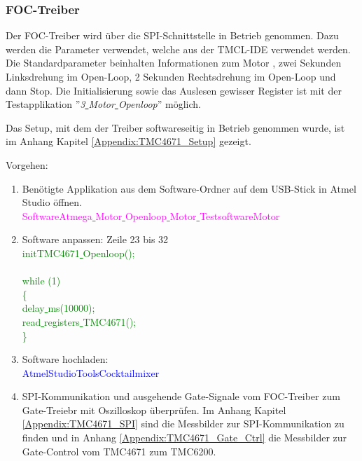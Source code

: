 \subsubsection{FOC-Treiber}
\label{subsubsec:Inbetriebnahme_FOC_Treiber}

Der FOC-Treiber wird über die SPI-Schnittstelle in Betrieb genommen. Dazu werden die Parameter verwendet, welche aus der TMCL-IDE verwendet werden. Die Standardparameter beinhalten Informationen zum Motor , zwei Sekunden Linksdrehung im Open-Loop, 2 Sekunden Rechtsdrehung im Open-Loop und dann Stop. Die Initialisierung sowie das Auslesen gewisser Register ist mit der Testapplikation ''\textit{3\underline{ }Motor\underline{ }Openloop}'' möglich.

Das Setup, mit dem der Treiber softwareseitig in Betrieb genommen wurde, ist im Anhang Kapitel \ref{Appendix:TMC4671_Setup} gezeigt.

Vorgehen:
\begin{enumerate}
\item Benötigte Applikation aus dem Software-Ordner auf dem USB-Stick in Atmel Studio öffnen.\\
\textcolor{magenta}{Software\textrightarrow Atmega\underline{ }Motor\underline{ }Openloop\underline{ }Motor\underline{ }Testsoftware\textrightarrow Motor}\\

\item Software anpassen: Zeile 23 bis 32\\
\textcolor{green}{
	initTMC4671\underline{ }Openloop();\\
\\
    while (1) \\
    \{\\
		\underline{ }delay\underline{ }ms(10000);\\
		read\underline{ }registers\underline{ }TMC4671();\\
    \}
}\\

\item Software hochladen:\\
\textcolor{blue}{AtmelStudio\textrightarrow Tools\textrightarrow Cocktailmixer}\\

\item SPI-Kommunikation und ausgehende Gate-Signale vom FOC-Treiber zum Gate-Treiebr mit Oszilloskop überprüfen. Im Anhang Kapitel \ref{Appendix:TMC4671_SPI} sind die Messbilder zur SPI-Kommunikation zu finden und in Anhang \ref{Appendix:TMC4671_Gate_Ctrl} die Messbilder zur Gate-Control vom TMC4671 zum TMC6200.

\end{enumerate}